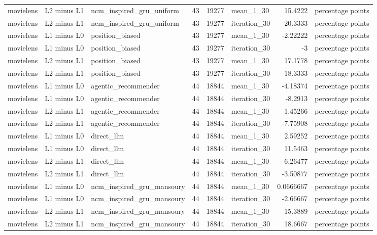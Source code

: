 \begin{table}[htbp!]
\begin{tabular}{lllrrlrl}
movielens & L2 minus L1 & ncm\_inspired\_gru\_uniform & 43 & 19277 & mean\_1\_30 & 15.4222 & percentage points \\
movielens & L2 minus L1 & ncm\_inspired\_gru\_uniform & 43 & 19277 & iteration\_30 & 20.3333 & percentage points \\
movielens & L1 minus L0 & position\_biased & 43 & 19277 & mean\_1\_30 & -2.22222 & percentage points \\
movielens & L1 minus L0 & position\_biased & 43 & 19277 & iteration\_30 & -3 & percentage points \\
movielens & L2 minus L1 & position\_biased & 43 & 19277 & mean\_1\_30 & 17.1778 & percentage points \\
movielens & L2 minus L1 & position\_biased & 43 & 19277 & iteration\_30 & 18.3333 & percentage points \\
movielens & L1 minus L0 & agentic\_recommender & 44 & 18844 & mean\_1\_30 & -4.18374 & percentage points \\
movielens & L1 minus L0 & agentic\_recommender & 44 & 18844 & iteration\_30 & -8.2913 & percentage points \\
movielens & L2 minus L1 & agentic\_recommender & 44 & 18844 & mean\_1\_30 & 1.45266 & percentage points \\
movielens & L2 minus L1 & agentic\_recommender & 44 & 18844 & iteration\_30 & -7.75908 & percentage points \\
movielens & L1 minus L0 & direct\_llm & 44 & 18844 & mean\_1\_30 & 2.59252 & percentage points \\
movielens & L1 minus L0 & direct\_llm & 44 & 18844 & iteration\_30 & 11.5463 & percentage points \\
movielens & L2 minus L1 & direct\_llm & 44 & 18844 & mean\_1\_30 & 6.26477 & percentage points \\
movielens & L2 minus L1 & direct\_llm & 44 & 18844 & iteration\_30 & -3.50877 & percentage points \\
movielens & L1 minus L0 & ncm\_inspired\_gru\_mansoury & 44 & 18844 & mean\_1\_30 & 0.0666667 & percentage points \\
movielens & L1 minus L0 & ncm\_inspired\_gru\_mansoury & 44 & 18844 & iteration\_30 & -2.66667 & percentage points \\
movielens & L2 minus L1 & ncm\_inspired\_gru\_mansoury & 44 & 18844 & mean\_1\_30 & 15.3889 & percentage points \\
movielens & L2 minus L1 & ncm\_inspired\_gru\_mansoury & 44 & 18844 & iteration\_30 & 18.6667 & percentage points \\

\end{tabular}
\end{table}
